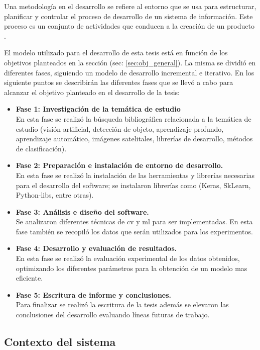 Una metodología en el desarrollo se refiere al entorno que se usa para estructurar, planificar y controlar el proceso de desarrollo de un sistema de información. Este proceso es un conjunto de actividades que conducen a la creación de un producto \citep{sommerville}.


El modelo utilizado para el desarrollo de esta tesis está en función de los objetivos planteados en la sección (sec: \ref{sec:obj_general}). La misma se dividió en diferentes fases, siguiendo un modelo de desarrollo incremental e iterativo. En los siguiente puntos se describirán las diferentes fases que se llevó a cabo para alcanzar el objetivo planteado en el desarrollo de la tesis:
\begin{itemize}
	\item \textbf{Fase 1: Investigación de la temática de estudio}\\
	En esta fase se realizó la búsqueda bibliográfica relacionada a la temática de estudio (visión artificial, detección de objeto, 
	aprendizaje profundo, aprendizaje automático, imágenes satelitales, librerías de desarrollo, métodos de clasificación).
	\item \textbf{Fase 2: Preparación e instalación de entorno de desarrollo.}\\
	En esta fase se realizó la instalación de las herramientas y librerías necesarias para el desarrollo del software; se instalaron librerías  
como (Keras, SkLearn, Python-libs, entre otras).
	\item \textbf{Fase 3: Análisis e diseño del software.}\\
	Se analizaron diferentes técnicas de \ac{cv} y \ac{ml} para ser implementadas. En esta fase también se recopiló los datos que serán utilizados para los experimentos.
	\item \textbf{Fase 4: Desarrollo y evaluación de resultados.}\\
	En esta fase se realizó la evaluación experimental de los datos obtenidos, optimizando los diferentes parámetros para la obtención de un 
modelo mas eficiente.
	\item \textbf{Fase 5: Escritura de informe y conclusiones.}\\
	Para finalizar se realizó la escritura de la tesis además se elevaron las conclusiones del desarrollo evaluando líneas futuras de trabajo.
\end{itemize}


\subsection{Contexto del sistema}\label{sub:casodeuso}

